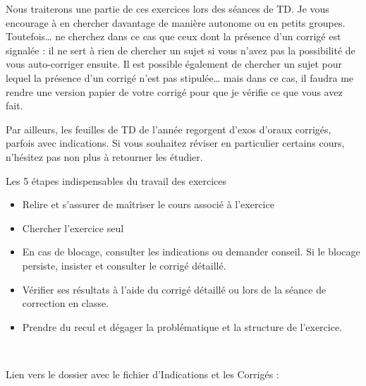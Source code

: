\vspace{1em}



Nous traiterons une partie de ces exercices lors des séances de TD. Je vous encourage à en chercher davantage de manière autonome ou en petits groupes. Toutefois… ne cherchez dans ce cas que ceux dont la présence d’un corrigé est signalée : il ne sert à rien de chercher un sujet si vous n’avez pas la possibilité de vous auto-corriger ensuite. Il est possible également de chercher un sujet pour lequel la présence d’un corrigé n’est pas stipulée… mais dans ce cas, il faudra me rendre une version papier de votre corrigé pour que je vérifie ce que vous avez fait.

Par ailleurs, les feuilles de TD de l’année regorgent d’exos d’oraux corrigés, parfois avec indications. Si vous souhaitez réviser en particulier certains cours, n’hésitez pas non plus à retourner les étudier.


\begin{bclogo}[logo=\bcoutil , noborder=True, couleur=yellow!10!white]{\hfill{Les 5 étapes indispensables du travail des exercices}}

\begin{itemize}

\item[$\bullet$] Relire et s’assurer de maîtriser le cours associé à l’exercice

\item[$\bullet$] Chercher l’exercice seul

\item[$\bullet$] En cas de blocage, consulter les indications ou demander conseil. Si le blocage persiste, insister et consulter le corrigé détaillé.

\item[$\bullet$] Vérifier ses résultats à l’aide du corrigé détaillé ou lors de la séance de correction en classe.

\item[$\bullet$] Prendre du recul et dégager la problématique et la structure de l’exercice.

\end{itemize}
\end{bclogo}


\newpage
\tableofcontents
\newpage
~
\vfill

Lien vers le dossier avec le fichier d’Indications et les Corrigés :

\begin{flushright}
\end{flushright}


